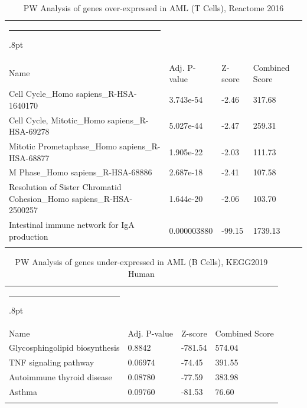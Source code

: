 \documentclass[3p,authoryear,preprint,12pt]{elsarticle}
\makeatletter
\def\hlinewd#1{%
  \noalign{\ifnum0=`}\fi\hrule \@height #1%
  \futurelet\reserved@a\@xhline}
\def\tbltoprule{\hlinewd{.8pt}\\[-12pt]}
\def\tblbottomrule{\noalign{\vspace*{6pt}}\hline\noalign{\vspace*{2pt}}}
\def\tblmidrule{\noalign{\vspace*{6pt}}\hline\noalign{\vspace*{2pt}}}
\makeatother
\begin{document}
\begin{table}[!htbp]
	\caption{{PW Analysis of genes over-expressed in AML (T Cells), Reactome 2016} }
	\label{tw-de478ae31cw6}
	\def\arraystretch{1}
	\ignorespaces 
	\centering 
	\begin{tabulary}{\linewidth}{p{\dimexpr.65\tabcolsep}p{\dimexpr.15\tabcolsep}p{\dimexpr.1\tabcolsep}p{\dimexpr.1\tabcolsep}}
		\tbltoprule Name & Adj. P-value & Z-score & Combined Score\\
		\tblmidrule
Cell Cycle\_Homo sapiens\_R-HSA-1640170 & 3.743e-54 & -2.46 & 317.68 \\
Cell Cycle, Mitotic\_Homo sapiens\_R-HSA-69278 & 5.027e-44 & -2.47 & 259.31 \\
Mitotic Prometaphase\_Homo sapiens\_R-HSA-68877 & 1.905e-22 & -2.03 & 111.73 \\
M Phase\_Homo sapiens\_R-HSA-68886 & 2.687e-18 & -2.41 & 107.58 \\
Resolution of Sister Chromatid Cohesion\_Homo sapiens\_R-HSA-2500257 & 1.644e-20 & -2.06 & 103.70 \\
Intestinal immune network for IgA production & 0.000003880 & -99.15 & 1739.13 \\
		\tblbottomrule
	\end{tabulary}\par 
\end{table}
\begin{table}[!htbp]
	\caption{{PW Analysis of genes under-expressed in AML (B Cells), KEGG2019 Human} }
	\label{tw-de478ae31cx6}
	\def\arraystretch{1}
	\ignorespaces 
	\centering 
	\begin{tabulary}{\linewidth}{p{\dimexpr.65\tabcolsep}p{\dimexpr.15\tabcolsep}p{\dimexpr.1\tabcolsep}p{\dimexpr.1\tabcolsep}}
		\tbltoprule Name & Adj. P-value & Z-score & Combined Score\\
		\tblmidrule
Glycosphingolipid biosynthesis & 0.8842 & -781.54 & 574.04 \\
TNF signaling pathway & 0.06974 & -74.45 & 391.55 \\
Autoimmune thyroid disease & 0.08780 & -77.59 & 383.98 \\
Asthma & 0.09760 & -81.53 & 76.60 \\
		\tblbottomrule
	\end{tabulary}\par 
\end{table}
\end{document}
